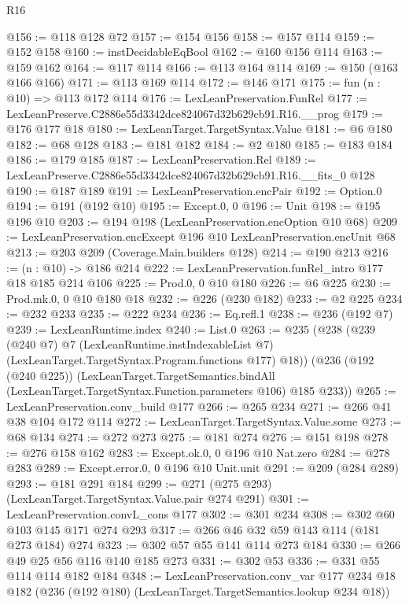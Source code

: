 \begin{lexlean}{R16}
\begin{coremodule}
@156 := @118 @128 @72
@157 := @154 @156
@158 := @157 @114
@159 := @152 @158
@160 := instDecidableEqBool
@162 := @160 @156 @114
@163 := @159 @162
@164 := @117 @114
@166 := @113 @164 @114
@169 := @150 (@163 @166 @166)
@171 := @113 @169 @114
@172 := @146 @171
@175 := fun (n : @10) => @113 @172 @114
@176 := LexLeanPreservation.FunRel
@177 := LexLeanPreserve.C2886e55d3342dce824067d32b629cb91.R16.__prog
@179 := @176 @177 @18
@180 := LexLeanTarget.TargetSyntax.Value
@181 := @6 @180
@182 := @68 @128
@183 := @181 @182
@184 := @2 @180
@185 := @183 @184
@186 := @179 @185
@187 := LexLeanPreservation.Rel
@189 := LexLeanPreserve.C2886e55d3342dce824067d32b629cb91.R16.__fits_0 @128
@190 := @187 @189
@191 := LexLeanPreservation.encPair
@192 := Option.{0}
@194 := @191 (@192 @10)
@195 := Except.{0, 0}
@196 := Unit
@198 := @195 @196 @10
@203 := @194 @198 (LexLeanPreservation.encOption @10 @68)
@209 := LexLeanPreservation.encExcept @196 @10 LexLeanPreservation.encUnit @68
@213 := @203 @209 (Coverage.Main.builders @128)
@214 := @190 @213
@216 := (n : @10) -> @186 @214
@222 := LexLeanPreservation.funRel_intro @177 @18 @185 @214 @106
@225 := Prod.{0, 0} @10 @180
@226 := @6 @225
@230 := Prod.mk.{0, 0} @10 @180 @18
@232 := @226 (@230 @182)
@233 := @2 @225
@234 := @232 @233
@235 := @222 @234
@236 := Eq.refl.{1}
@238 := @236 (@192 @7)
@239 := LexLeanRuntime.index
@240 := List.{0}
@263 := @235
    (@238
      (@239
        (@240 @7)
        @7
        (LexLeanRuntime.instIndexableList @7)
        (LexLeanTarget.TargetSyntax.Program.functions @177)
        @18))
    (@236
      (@192 (@240 @225))
      (LexLeanTarget.TargetSemantics.bindAll
        (LexLeanTarget.TargetSyntax.Function.parameters @106)
        @185
        @233))
@265 := LexLeanPreservation.conv_build @177
@266 := @265 @234
@271 := @266 @41 @38 @104 @172 @114
@272 := LexLeanTarget.TargetSyntax.Value.some
@273 := @68 @134
@274 := @272 @273
@275 := @181 @274
@276 := @151 @198
@278 := @276 @158 @162
@283 := Except.ok.{0, 0} @196 @10 Nat.zero
@284 := @278 @283
@289 := Except.error.{0, 0} @196 @10 Unit.unit
@291 := @209 (@284 @289)
@293 := @181 @291 @184
@299 := @271 (@275 @293) (LexLeanTarget.TargetSyntax.Value.pair @274 @291)
@301 := LexLeanPreservation.convL_cons @177
@302 := @301 @234
@308 := @302 @60 @103 @145 @171 @274 @293
@317 := @266 @46 @32 @59 @143 @114 (@181 @273 @184) @274
@323 := @302 @57 @55 @141 @114 @273 @184
@330 := @266 @49 @25 @56 @116 @140 @185 @273
@331 := @302 @53
@336 := @331 @55 @114 @114 @182 @184
@348 := LexLeanPreservation.conv_var
    @177
    @234
    @18
    @182
    (@236 (@192 @180) (LexLeanTarget.TargetSemantics.lookup @234 @18))

\end{coremodule}
\end{lexlean}
